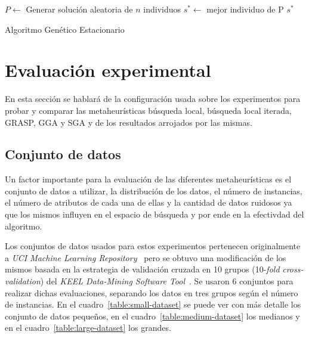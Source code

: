\documentclass{ci5652}
\begin{document}
\begin{algorithm}[!h]
    \DontPrintSemicolon
    \vspace*{0.1cm}

	$P \leftarrow $ Generar solución aleatoria de $n$ individuos\;
	$s^{*} \leftarrow $ mejor individuo de P\;
	\Return $s^{*}$    
    \vspace*{0.1cm}
    \caption{Algoritmo Genético Estacionario}
    \label{alg:sga}
\end{algorithm}
\section{Evaluación experimental}
En esta sección se hablará de la configuración usada sobre los experimentos para probar y comparar las metaheurísticas búsqueda local, búsqueda local iterada, GRASP, GGA y SGA y de los resultados arrojados por las mismas.

\subsection{Conjunto de datos}

Un factor importante para la evaluación de las diferentes metaheurísticas es el conjunto de datos a utilizar, la distribución de los datos, el número de instancias, el número de atributos de cada una de ellas y la cantidad de datos ruidosos ya que los mismos influyen en el espacio de búsqueda y por ende en la efectivdad del algoritmo. 

Los conjuntos de datos usados para estos experimentos pertenecen originalmente a \textit{UCI Machine Learning Repository}~\cite{Lichman:2013} pero se obtuvo una modificación de los mismos basada en la estrategia de validación cruzada en 10 grupos (10-\textit{fold} \textit{cross-validation}) del \textit{KEEL Data-Mining Software Tool}~\cite{alcala2010keel}. Se usaron 6 conjuntos para realizar dichas evaluaciones, separando los datos en tres grupos según el número de instancias. En el cuadro~\ref{table:small-dataset} se puede ver con más detalle los conjunto de datos pequeños, en el cuadro~\ref{table:medium-dataset} los medianos y en el cuadro~\ref{table:large-dataset} los grandes.
\end{document}
